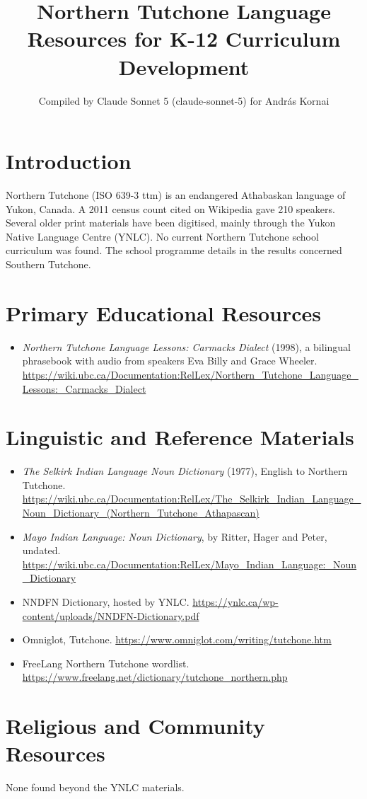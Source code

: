\documentclass[12pt]{article}
\title{Northern Tutchone Language Resources for K-12 Curriculum Development}
\author{Compiled by Claude Sonnet 5 (claude-sonnet-5) for Andr\'as Kornai}
\date{}
\begin{document}
\maketitle
\section{Introduction}
Northern Tutchone (ISO 639-3 ttm) is an endangered Athabaskan language of Yukon, Canada. A 2011 census count cited on Wikipedia gave 210 speakers. Several older print materials have been digitised, mainly through the Yukon Native Language Centre (YNLC). No current Northern Tutchone school curriculum was found. The school programme details in the results concerned Southern Tutchone.
\section{Primary Educational Resources}
\begin{itemize}
\item \emph{Northern Tutchone Language Lessons: Carmacks Dialect} (1998), a bilingual phrasebook with audio from speakers Eva Billy and Grace Wheeler. \url{https://wiki.ubc.ca/Documentation:RelLex/Northern_Tutchone_Language_Lessons:_Carmacks_Dialect}
\end{itemize}
\section{Linguistic and Reference Materials}
\begin{itemize}
\item \emph{The Selkirk Indian Language Noun Dictionary} (1977), English to Northern Tutchone. \url{https://wiki.ubc.ca/Documentation:RelLex/The_Selkirk_Indian_Language_Noun_Dictionary_(Northern_Tutchone_Athapascan)}
\item \emph{Mayo Indian Language: Noun Dictionary}, by Ritter, Hager and Peter, undated. \url{https://wiki.ubc.ca/Documentation:RelLex/Mayo_Indian_Language:_Noun_Dictionary}
\item NNDFN Dictionary, hosted by YNLC. \url{https://ynlc.ca/wp-content/uploads/NNDFN-Dictionary.pdf}
\item Omniglot, Tutchone. \url{https://www.omniglot.com/writing/tutchone.htm}
\item FreeLang Northern Tutchone wordlist. \url{https://www.freelang.net/dictionary/tutchone_northern.php}
\end{itemize}
\section{Religious and Community Resources}
None found beyond the YNLC materials.
\end{document}
